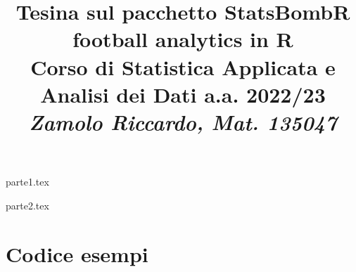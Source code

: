 \documentclass[12pt]{article}
\title{
    Tesina sul pacchetto StatsBombR \\ 
    \vspace{5pt} \large{football analytics in R} \\ 
    \vspace{20pt} \normalsize{Corso di Statistica Applicata e Analisi dei Dati a.a. 2022/23} \\ 
    \vspace{10pt} \textit{Zamolo Riccardo, Mat. 135047}
}
\begin{document}
    \date{}
    \maketitle
    
    \newpage
    
    \listoffigures
    \tableofcontents

    \newpage

    {parte1.tex}

    \newpage

    {parte2.tex}

    \newpage
    
    \appendix
    \section{Codice esempi}
    
    \vspace{30pt}
    
    \vspace{30pt}
    
    \newpage
    
    \printbibliography
\end{document}
